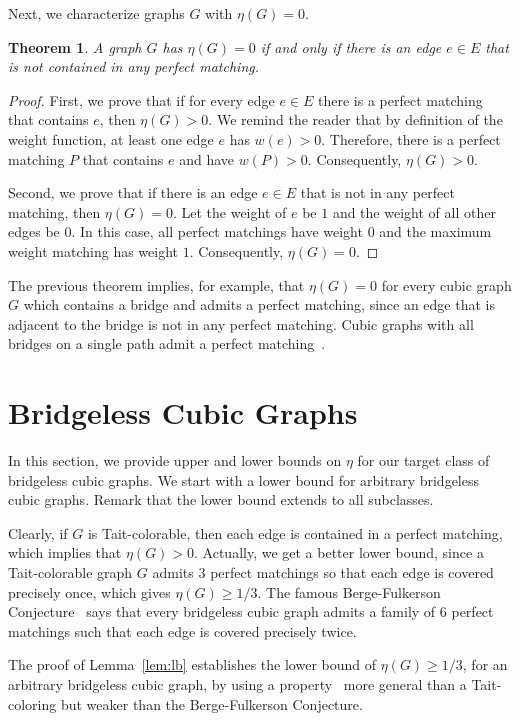 \documentclass{article}
\newtheorem{thm}{Theorem}
\begin{document}
Next, we characterize graphs $G$ with $\eta(G) = 0$.

\begin{thm} \label{thm:eta0}
A graph $G$ has $\eta(G) = 0$ if and only if there is an edge $e \in E$ that is not contained in any perfect matching.
\end{thm}
\begin{proof}
First, we prove that if for every edge $e \in E$ there is a perfect matching that contains $e$, then $\eta(G) > 0$. We remind the reader that by definition of the weight function, at least one edge $e$ has $w(e) > 0$. Therefore, there is a perfect matching $P$ that contains $e$ and have $w(P) > 0$. Consequently, $\eta(G) > 0$.

Second, we prove that if there is an edge $e \in E$ that is not in any perfect matching, then $\eta(G) = 0$. Let the weight of $e$ be $1$ and the weight of all other edges be $0$. In this case, all perfect matchings have weight $0$ and the maximum weight matching has weight $1$. Consequently, $\eta(G) = 0$.
\end{proof}

The previous theorem implies, for example, that $\eta(G) = 0$ for every cubic graph $G$ which contains a bridge and admits a perfect matching, since an edge that is adjacent to the bridge is not in any perfect matching. Cubic graphs with all bridges on a single path admit a perfect matching~\cite{errera22}.

\section{Bridgeless Cubic Graphs}
\label{cubic}

In this section, we provide upper and lower bounds on $\eta$ for our target class of bridgeless cubic graphs. We start with a lower bound for arbitrary bridgeless cubic graphs. Remark that the lower bound extends to all subclasses.

Clearly, if $G$ is Tait-colorable, then each edge is contained in a perfect matching, which implies that $\eta(G)>0$. Actually, we get a better lower bound, since a Tait-colorable graph $G$ admits 3 perfect matchings so that each edge is covered precisely once, which gives $\eta(G) \geq 1/3$. The famous Berge-Fulkerson Conjecture~\cite{Fulkerson1971,Giuseppe} says that every bridgeless cubic graph admits a family of 6 perfect matchings such that each edge is covered precisely twice.

The proof of Lemma~\ref{lem:lb} establishes the lower bound of $\eta(G) \geq 1/3$, for an arbitrary bridgeless cubic graph, by using a property~\cite{edmonds65} more general than a Tait-coloring but weaker than the Berge-Fulkerson Conjecture.
\end{document}
